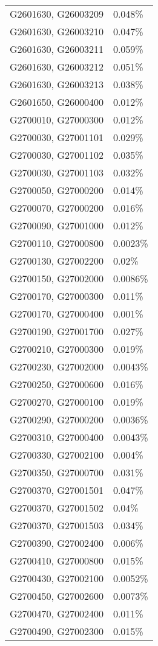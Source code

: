 \begin{longtable}[]{@{}ll@{}}
G2601630, G26003209 & 0.048\% \\
G2601630, G26003210 & 0.047\% \\
G2601630, G26003211 & 0.059\% \\
G2601630, G26003212 & 0.051\% \\
G2601630, G26003213 & 0.038\% \\
G2601650, G26000400 & 0.012\% \\
G2700010, G27000300 & 0.012\% \\
G2700030, G27001101 & 0.029\% \\
G2700030, G27001102 & 0.035\% \\
G2700030, G27001103 & 0.032\% \\
G2700050, G27000200 & 0.014\% \\
G2700070, G27000200 & 0.016\% \\
G2700090, G27001000 & 0.012\% \\
G2700110, G27000800 & 0.0023\% \\
G2700130, G27002200 & 0.02\% \\
G2700150, G27002000 & 0.0086\% \\
G2700170, G27000300 & 0.011\% \\
G2700170, G27000400 & 0.001\% \\
G2700190, G27001700 & 0.027\% \\
G2700210, G27000300 & 0.019\% \\
G2700230, G27002000 & 0.0043\% \\
G2700250, G27000600 & 0.016\% \\
G2700270, G27000100 & 0.019\% \\
G2700290, G27000200 & 0.0036\% \\
G2700310, G27000400 & 0.0043\% \\
G2700330, G27002100 & 0.004\% \\
G2700350, G27000700 & 0.031\% \\
G2700370, G27001501 & 0.047\% \\
G2700370, G27001502 & 0.04\% \\
G2700370, G27001503 & 0.034\% \\
G2700390, G27002400 & 0.006\% \\
G2700410, G27000800 & 0.015\% \\
G2700430, G27002100 & 0.0052\% \\
G2700450, G27002600 & 0.0073\% \\
G2700470, G27002400 & 0.011\% \\
G2700490, G27002300 & 0.015\% \\

\end{longtable}
